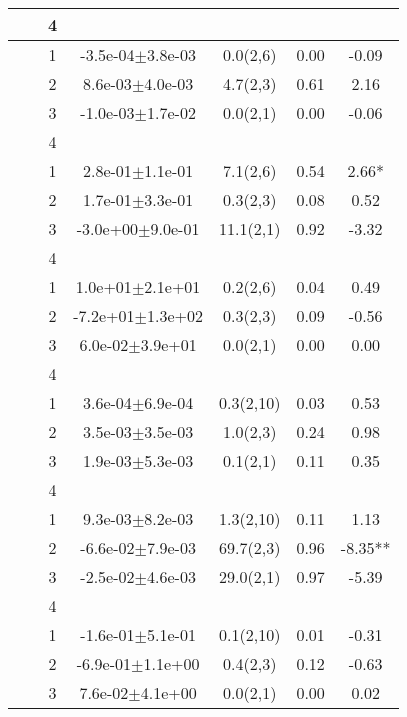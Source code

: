 \begin{longtable}{llccccS[table-format=-2.2, table-space-text-post = {***}]}
   &  & 4 &  &  &  &  \\ 
   \midrule
{} & {} & 1 & -3.5e-04$\pm$3.8e-03 & 0.0(2,6) & 0.00 & -0.09 \\ 
   &  & 2 &  8.6e-03$\pm$4.0e-03 & 4.7(2,3) & 0.61 & 2.16 \\ 
   &  & 3 & -1.0e-03$\pm$1.7e-02 & 0.0(2,1) & 0.00 & -0.06 \\ 
   &  & 4 &  &  &  &  \\ 
   \midrule
{} & {} & 1 &  2.8e-01$\pm$1.1e-01 & 7.1(2,6) & 0.54 & 2.66* \\ 
   &  & 2 &  1.7e-01$\pm$3.3e-01 & 0.3(2,3) & 0.08 & 0.52 \\ 
   &  & 3 & -3.0e+00$\pm$9.0e-01 & 11.1(2,1) & 0.92 & -3.32 \\ 
   &  & 4 &  &  &  &  \\ 
   \midrule
{} & {} & 1 &  1.0e+01$\pm$2.1e+01 & 0.2(2,6) & 0.04 & 0.49 \\ 
   &  & 2 & -7.2e+01$\pm$1.3e+02 & 0.3(2,3) & 0.09 & -0.56 \\ 
   &  & 3 &  6.0e-02$\pm$3.9e+01 & 0.0(2,1) & 0.00 & 0.00 \\ 
   &  & 4 &  &  &  &  \\ 
   \midrule
{} & {} & 1 &  3.6e-04$\pm$6.9e-04 & 0.3(2,10) & 0.03 & 0.53 \\ 
   &  & 2 &  3.5e-03$\pm$3.5e-03 & 1.0(2,3) & 0.24 & 0.98 \\ 
   &  & 3 &  1.9e-03$\pm$5.3e-03 & 0.1(2,1) & 0.11 & 0.35 \\ 
   &  & 4 &  &  &  &  \\ 
   \midrule
{} & {} & 1 &  9.3e-03$\pm$8.2e-03 & 1.3(2,10) & 0.11 & 1.13 \\ 
   &  & 2 & -6.6e-02$\pm$7.9e-03 & 69.7(2,3) & 0.96 & -8.35** \\ 
   &  & 3 & -2.5e-02$\pm$4.6e-03 & 29.0(2,1) & 0.97 & -5.39 \\ 
   &  & 4 &  &  &  &  \\ 
   \midrule
{} & {} & 1 & -1.6e-01$\pm$5.1e-01 & 0.1(2,10) & 0.01 & -0.31 \\ 
   &  & 2 & -6.9e-01$\pm$1.1e+00 & 0.4(2,3) & 0.12 & -0.63 \\ 
   &  & 3 &  7.6e-02$\pm$4.1e+00 & 0.0(2,1) & 0.00 & 0.02 \\ 

\end{longtable}
